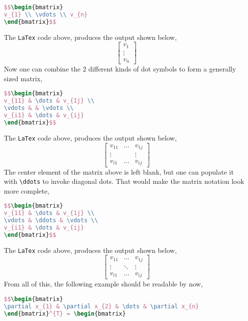 \documentclass[a4paper, 12pt]{report}
\begin{document}
\begin{center}
\begin{lstlisting}[language=tex]
$$\begin{bmatrix}
v_{1} \\ \vdots \\ v_{n}
\end{bmatrix}$$
\end{lstlisting}
The \texttt{LaTex} code above, produces the output shown below,
$$\begin{bmatrix}
v_{1} \\ \vdots \\ v_{n}
\end{bmatrix}$$
Now one can combine the $2$ different kinds of dot symbols to form a generally sized matrix,
\begin{lstlisting}[language=tex]
$$\begin{bmatrix}
v_{11} & \dots & v_{1j} \\
\vdots & & \vdots \\
v_{i1} & \dots & v_{ij}
\end{bmatrix}$$
\end{lstlisting}
The \texttt{LaTex} code above, produces the output shown below,
$$\begin{bmatrix}
v_{11} & \dots & v_{1j} \\
\vdots & & \vdots \\
v_{i1} & \dots & v_{ij}
\end{bmatrix}$$
The center element of the matrix above is left blank, but one can populate it with \texttt{\textbackslash ddots} to invoke diagonal dots. That would make the matrix notation look more complete,
\begin{lstlisting}[language=tex]
$$\begin{bmatrix}
v_{11} & \dots & v_{1j} \\
\vdots & \ddots & \vdots \\
v_{i1} & \dots & v_{ij}
\end{bmatrix}$$
\end{lstlisting}
The \texttt{LaTex} code above, produces the output shown below,
$$\begin{bmatrix}
v_{11} & \dots & v_{1j} \\
\vdots & \ddots & \vdots \\
v_{i1} & \dots & v_{ij}
\end{bmatrix}$$
From all of this, the following example should be readable by now,
\begin{lstlisting}[language=tex]
$$\begin{bmatrix}
\partial x_{1} & \partial x_{2} & \dots & \partial x_{n}
\end{bmatrix}^{T} = \begin{bmatrix}

\end{lstlisting}
\end{center}
\end{document}
